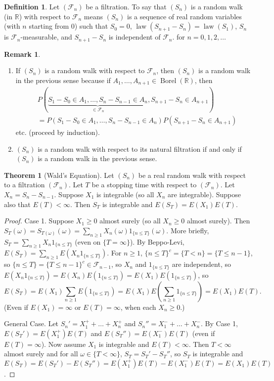 \documentclass{article}
\DeclareMathOperator{\law}{law}
\DeclareMathOperator{\Borel}{Borel}
\newcommand{\R}{\mathbb{R}}
\newcommand{\F}{\mathscr{F}}
\theoremstyle{definition}
\newtheorem{theorem}{Theorem}
\newtheorem*{definition}{Definition}
\newtheorem*{remark}{Remark}
\begin{document}
\begin{definition}
Let $(\F_n)$ be a filtration. To say that $(S_n)$ is a random walk (in $\R$) with respect to $\F_n$ means $(S_n)$ is a sequence of real random variables (with $n$ starting from $0$) such that $S_0 = 0$, $\law(S_{n+1} - S_n) = \law(S_1)$, $S_n$ is $\F_n$-measurable, and $S_{n+1} - S_n$ is independent of $\F_n$. for $n = 0, 1, 2, \dots$
\end{definition}

\begin{remark}
\begin{enumerate}
    \item If $(S_n)$ is a random walk with respect to $\F_n$, then $(S_n)$ is a random walk in the previous sense because if $A_1, \dots, A_{n+1} \in \Borel(\R)$, then
    \begin{align*}
        &P(\underbrace{S_1 - S_0 \in A_1, \dots, S_n - S_{n-1} \in A_n}_{\in \F_n}, S_{n+1} - S_n \in A_{n+1}) \\
        &= P(S_1 - S_0 \in A_1, \dots, S_n - S_{n-1} \in A_n)P(S_{n+1} - S_n \in A_{n+1})
    \end{align*}
    etc. (proceed by induction).
    \item $(S_n)$ is a random walk with respect to its natural filtration if and only if $(S_n)$ is a random walk in the previous sense.
\end{enumerate}
\end{remark}

\begin{theorem}[Wald's Equation]
    Let $(S_n)$ be a real random walk with respect to a filtration $(\F_n)$. Let $T$ be a stopping time with respect to $(\F_n)$. Let $X_n = S_n - S_{n-1}$. Suppose $X_1$ is integrable (so all $X_n$ are integrable). Suppose also that $E(T) < \infty$. Then $S_T$ is integrable and $E(S_T) = E(X_1)E(T)$.
\end{theorem}
\begin{proof}
    Case 1. Suppose $X_1 \geq 0$ almost surely (so all $X_n \geq 0$ almost surely). Then $S_T(\omega) = S_{T(\omega)}(\omega) = \sum_{n \geq 1} X_n(\omega) 1_{\{n \leq T\}}(\omega)$. More briefly, $S_T = \sum_{n \geq 1} X_n 1_{\{n \leq T\}}$ (even on $\{T = \infty\}$).
    By Beppo-Levi, $E(S_T) = \sum_{n \geq 1} E(X_n 1_{\{n \leq T\}})$. For $n \geq 1$, $\{n \leq T\}^c = \{T < n\} = \{T \leq n-1\}$, so $\{n \leq T\} = \{T \leq n-1\}^c \in \F_{n-1}$, so $X_n$ and $1_{\{n \leq T\}}$ are independent, so $E(X_n 1_{\{n \leq T\}}) = E(X_n)E(1_{\{n \leq T\}}) = E(X_1)E(1_{\{n \leq T\}})$, so
    \[
        E(S_T) = E(X_1)\sum_{n \geq 1} E(1_{\{n \leq T\}}) = E(X_1)E\left(\sum_{n \geq 1} 1_{\{n \leq T\}} \right) = E(X_1)E(T).
    \]
    (Even if $E(X_1) = \infty$ or $E(T) = \infty$, when each $X_n \geq0$.)
    
    General Case. Let $S_n' = X_1^+ + \dots + X_n^+$ and $S_n'' = X_1^- + \dots + X_n^-$. By Case 1, $E(S_T') = E(X_1^+)E(T)$ and $E(S_T'') = E(X_1^-)E(T)$ (even if $E(T) = \infty$). Now assume $X_1$ is integrable and $E(T) < \infty$. Then $T < \infty$ almost surely and for all $\omega \in \{T < \infty\}$, $S_T = S_T' - S_T''$, so $S_T$ is integrable and $E(S_T) = E(S_T') - E(S_T'') = E(X_1^+)E(T) - E(X_1^-)E(T) = E(X_1)E(T)$.
\end{proof}
\end{document}
